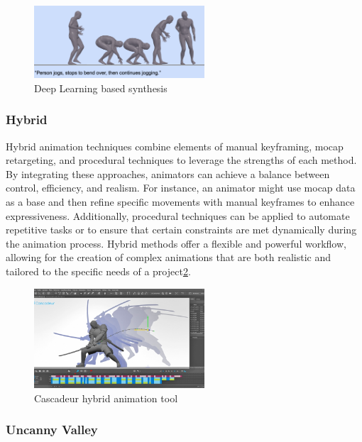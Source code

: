 \documentclass[../../main.tex]{subfiles}
\begin{document}
\begin{figure}
  \centering \includegraphics[width = 2.5in]{chapters/background_work/images/deep_learning_synthesis.png}
  \caption{Deep Learning based synthesis\cite{guo2022generating}}
  \label{fig:deep_learning_synthesis}
\end{figure}

\subsubsection{Hybrid}

Hybrid animation techniques combine elements of manual keyframing, mocap retargeting, and procedural techniques to leverage the strengths of each method. By integrating these approaches, animators can achieve a balance between control, efficiency, and realism. For instance, an animator might use mocap data as a base and then refine specific movements with manual keyframes to enhance expressiveness. Additionally, procedural techniques can be applied to automate repetitive tasks or to ensure that certain constraints are met dynamically during the animation process. Hybrid methods offer a flexible and powerful workflow, allowing for the creation of complex animations that are both realistic and tailored to the specific needs of a project\ref{fig:cascadeur}.

\begin{figure}
  \centering \includegraphics[width = 2.5in]{chapters/background_work/images/cascadeur.png}
  \caption{Cascadeur hybrid animation tool}
  \label{fig:cascadeur}
\end{figure}

\subsubsection{Uncanny Valley}
\end{document}
